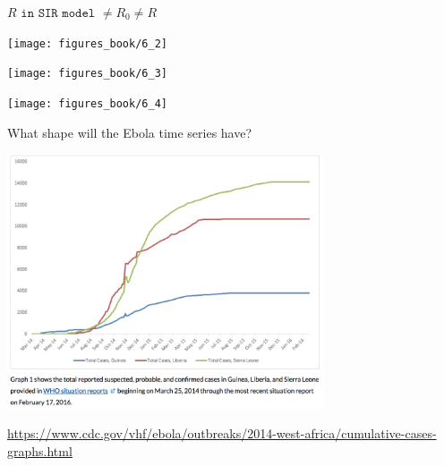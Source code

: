 \documentclass[aspectratio=169]{beamer}
\begin{document}
\begin{frame}

$R \texttt{ in SIR model } \ne R_0 \ne R$

\end{frame}
\begin{frame}

\begin{center}
\texttt{[image: figures\_book/6\_2]}
\end{center}



\end{frame}
\begin{frame}

\begin{center}
\texttt{[image: figures\_book/6\_3]}
\end{center}

\end{frame}
\begin{frame}

\begin{center}
\texttt{[image: figures\_book/6\_4]}
\end{center}

\end{frame}
\begin{frame}

What shape will the Ebola time series have?

\end{frame}
\begin{frame}

\begin{center}
\includegraphics[width = 0.7\textwidth]{figures/ebola_timeseries}
\end{center}

\vfill

\url{https://www.cdc.gov/vhf/ebola/outbreaks/2014-west-africa/cumulative-cases-graphs.html}


\end{frame}
\end{document}
